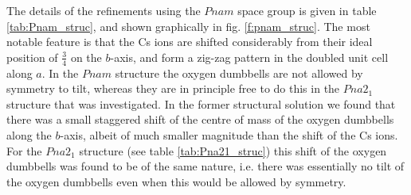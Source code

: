 \documentclass[prb,aps,twocolumn,superscriptaddress,showpacs,footinbib]{revtex4-2}
\begin{document}
The details of the refinements using the $Pnam$ space group is given in table \ref{tab:Pnam_struc}, and shown graphically in fig. \ref{f:pnam_struc}. The most notable feature is that the Cs ions are shifted considerably from their ideal position of $\frac{3}{4}$ on the $b$-axis, and form a zig-zag pattern in the doubled unit cell along $a$. In the $Pnam$ structure the oxygen dumbbells are not allowed by symmetry to tilt, whereas they are in principle free to do this in the $Pna2_{1}$ structure that was investigated. In the former structural solution we found that there was a small staggered shift of the centre of mass of the oxygen dumbbells along the $b$-axis, albeit of much smaller magnitude than the shift of the Cs ions. For the $Pna2_{1}$ structure (see table \ref{tab:Pna21_struc}) this shift of the oxygen dumbbells was found to be of the same nature, i.e. there was essentially no tilt of the oxygen dumbbells even when this would be allowed by symmetry.
\end{document}
